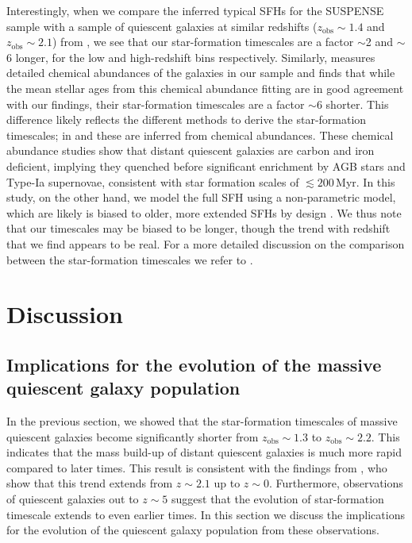 \documentclass[twocolumn, astrosymb]{aastex631}
\begin{document}
Interestingly, when we compare the inferred typical SFHs for the SUSPENSE sample with a sample of quiescent galaxies at similar redshifts ($z_{\text{obs}} \sim 1.4$ and $z_{\text{obs}}\sim2.1$) from \citet{ABeverage2024}, we see that our star-formation timescales are a factor $\sim$2 and $\sim$6 longer, for the low and high-redshift bins respectively. Similarly, \citet{ABeverage2024b} measures detailed chemical abundances of the galaxies in our sample and finds that while the mean stellar ages from this chemical abundance fitting are in good agreement with our findings, their star-formation timescales are a factor $\sim$6 shorter. This difference likely reflects the different methods to derive the star-formation timescales; in \citet{ABeverage2024} and \citet{ABeverage2024b} these are inferred from chemical abundances. These chemical abundance studies show that distant quiescent galaxies are carbon and iron deficient, implying they quenched before significant enrichment by AGB stars and Type-Ia supernovae, consistent with star formation scales of $\lesssim200$\,Myr.
In this study, on the other hand, we model the full SFH using a non-parametric model, which are likely is biased to older, more extended SFHs by design \citep{JLeja2019,JLeja2019_b,ACarnall2024}. We thus note that our timescales may be biased to be longer, though the trend with redshift that we find appears to be real. For a more detailed discussion on the comparison between the star-formation timescales we refer to \citet{ABeverage2024b}.

\section{Discussion}\label{sec:implications}
\subsection{Implications for the evolution of the massive quiescent galaxy population}
In the previous section, we showed that the star-formation timescales of massive quiescent galaxies become significantly shorter from $z_{\text{obs}} \sim 1.3$ to $z_{\text{obs}} \sim 2.2$. This indicates that the mass build-up of distant quiescent galaxies is much more rapid compared to later times. This result is consistent with the findings from \citet{ABeverage2024}, who show that this trend extends from $z \sim 2.1$ up to $z \sim 0$. Furthermore, observations of quiescent galaxies out to $z \sim 5$ \citep[e.g.,][]{BForrest2020b,KGlazebrook2023,ACarnall2023b, DSetton2024} suggest that the evolution of star-formation timescale extends to even earlier times. In this section we discuss the implications for the evolution of the quiescent galaxy population from these observations.
\end{document}
